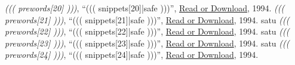 \documentclass{article}
\begin{document}
\begin{thebibliography}{99}
\emph{((( prewords[20] )))}, ``{((( snippets[20]|safe )))}'', \href{((( lander[20] )))}{Read or Download}, 1994.
\emph{((( prewords[21] )))}, ``{((( snippets[21]|safe )))}'', \href{((( lander[21] )))}{Read or Download}, 1994.
satu
\emph{((( prewords[22] )))}, ``{((( snippets[22]|safe )))}'', \href{((( lander[22] )))}{Read or Download}, 1994.
satu
\emph{((( prewords[23] )))}, ``{((( snippets[23]|safe )))}'', \href{((( lander[23] )))}{Read or Download}, 1994.
satu
\emph{((( prewords[24] )))}, ``{((( snippets[24]|safe )))}'', \href{((( lander[24] )))}{Read or Download}, 1994.

\end{thebibliography}
\end{document}
